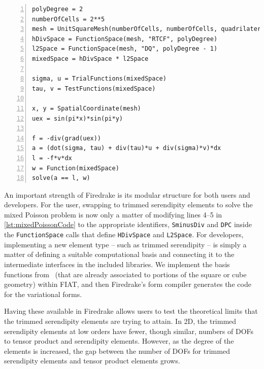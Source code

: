 \documentclass[format=acmsmall,screen,timestamp=false,a4paper]{acmart}
\newcommand\josh[1]{\textbf{\textcolor[rgb]{0,.5,1}{[Josh: #1]}}}
\begin{document}
\begin{lstlisting}[float=htpb,caption={Basic Firedrake implementation of the mixed Poisson problem showcasing where to choose the elements that are used and how to create the equations in Firedrake's notation.}, label={lst:mixedPoissonCode}, numbers=left, firstnumber=1, xleftmargin=20pt,  xrightmargin=20pt]
polyDegree = 2
numberOfCells = 2**5
mesh = UnitSquareMesh(numberOfCells, numberOfCells, quadrilateral=True)
hDivSpace = FunctionSpace(mesh, "RTCF", polyDegree)
l2Space = FunctionSpace(mesh, "DQ", polyDegree - 1)
mixedSpace = hDivSpace * l2Space

sigma, u = TrialFunctions(mixedSpace)
tau, v = TestFunctions(mixedSpace)

x, y = SpatialCoordinate(mesh)
uex = sin(pi*x)*sin(pi*y)

f = -div(grad(uex))
a = (dot(sigma, tau) + div(tau)*u + div(sigma)*v)*dx
l = -f*v*dx
w = Function(mixedSpace)
solve(a == l, w)
\end{lstlisting}


  
  
An important strength of Firedrake is its modular structure for both users and developers.
For the user, swapping to trimmed serendipity elements to solve the mixed Poisson problem is now only a matter of modifying lines 4--5 in \cref{lst:mixedPoissonCode} to the appropriate identifiers, \texttt{SminusDiv} and \texttt{DPC} inside the \texttt{FunctionSpace} calls that define \texttt{HDivSpace} and \texttt{L2Space}.
   For developers, implementing a new element type -- such as trimmed serendipity -- is simply a matter of defining a suitable computational basis and connecting it to the intermediate interfaces in the included libraries.  We implement the basis functions from~\cite{gillette2019computational} (that are already associated to portions of the square or cube geometry) within FIAT, and then Firedrake's form compiler generates the code for the variational forms.
   
   Having these available in Firedrake allows users to test the theoretical limits that the trimmed serendipity elements are trying to attain.  In 2D, the trimmed serendipity elements at low orders have fewer, though similar, numbers of DOFs to tensor product and serendipity elements.  However, as the degree of the elements is increased, the gap between the number of DOFs for trimmed serendipity elements and tensor product elements grows.  
   
\end{document}
